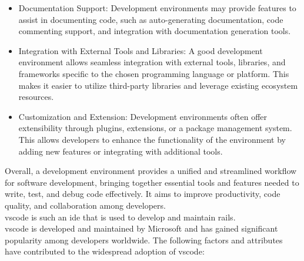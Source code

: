 \begin{itemize}
  \item Documentation Support: Development environments may provide features to assist in documenting code, such as auto-generating documentation, code commenting support, and integration with documentation generation tools.
  \item Integration with External Tools and Libraries: A good development environment allows seamless integration with external tools, libraries, and frameworks specific to the chosen programming language or platform. This makes it easier to utilize third-party libraries and leverage existing ecosystem resources.
  \item Customization and Extension: Development environments often offer extensibility through plugins, extensions, or a package management system. This allows developers to enhance the functionality of the environment by adding new features or integrating with additional tools.
\end{itemize}
Overall, a development environment provides a unified and streamlined workflow for software development, bringing together essential tools and features needed to write, test, and debug code effectively. It aims to improve productivity, code quality, and collaboration among developers.\vspace{5mm} \\
\gls{vscode} is such an \gls{ide} that is used to develop and maintain \gls{rails}.\vspace{5mm} \\
\gls{vscode} is developed and maintained by Microsoft and has gained significant popularity among developers worldwide. The following factors and attributes have contributed to the widespread adoption of \gls{vscode}:
